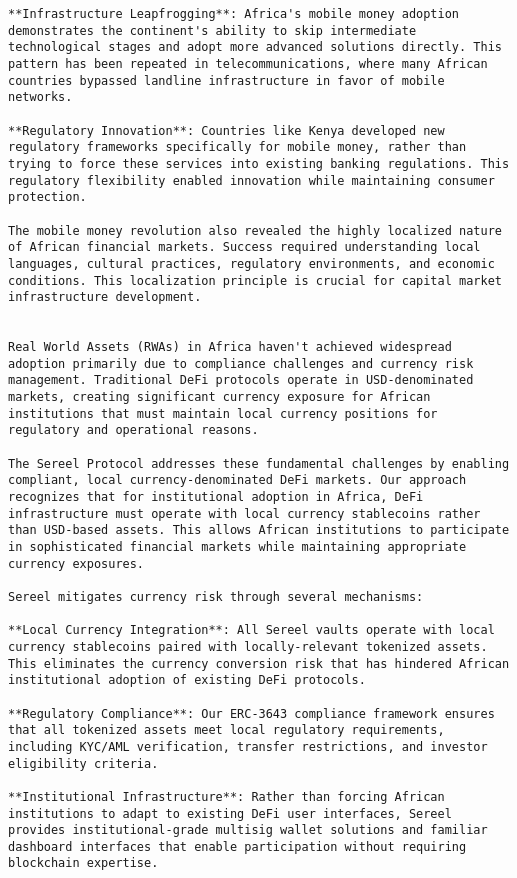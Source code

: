 \documentclass[12pt]{article}
\begin{document}
{{{\begin{itemize}
\begin{lstlisting}
**Infrastructure Leapfrogging**: Africa's mobile money adoption demonstrates the continent's ability to skip intermediate technological stages and adopt more advanced solutions directly. This pattern has been repeated in telecommunications, where many African countries bypassed landline infrastructure in favor of mobile networks.

**Regulatory Innovation**: Countries like Kenya developed new regulatory frameworks specifically for mobile money, rather than trying to force these services into existing banking regulations. This regulatory flexibility enabled innovation while maintaining consumer protection.

The mobile money revolution also revealed the highly localized nature of African financial markets. Success required understanding local languages, cultural practices, regulatory environments, and economic conditions. This localization principle is crucial for capital market infrastructure development.


Real World Assets (RWAs) in Africa haven't achieved widespread adoption primarily due to compliance challenges and currency risk management. Traditional DeFi protocols operate in USD-denominated markets, creating significant currency exposure for African institutions that must maintain local currency positions for regulatory and operational reasons.

The Sereel Protocol addresses these fundamental challenges by enabling compliant, local currency-denominated DeFi markets. Our approach recognizes that for institutional adoption in Africa, DeFi infrastructure must operate with local currency stablecoins rather than USD-based assets. This allows African institutions to participate in sophisticated financial markets while maintaining appropriate currency exposures.

Sereel mitigates currency risk through several mechanisms:

**Local Currency Integration**: All Sereel vaults operate with local currency stablecoins paired with locally-relevant tokenized assets. This eliminates the currency conversion risk that has hindered African institutional adoption of existing DeFi protocols.

**Regulatory Compliance**: Our ERC-3643 compliance framework ensures that all tokenized assets meet local regulatory requirements, including KYC/AML verification, transfer restrictions, and investor eligibility criteria.

**Institutional Infrastructure**: Rather than forcing African institutions to adapt to existing DeFi user interfaces, Sereel provides institutional-grade multisig wallet solutions and familiar dashboard interfaces that enable participation without requiring blockchain expertise.


\end{lstlisting}
\end{itemize}}}}
\end{document}
